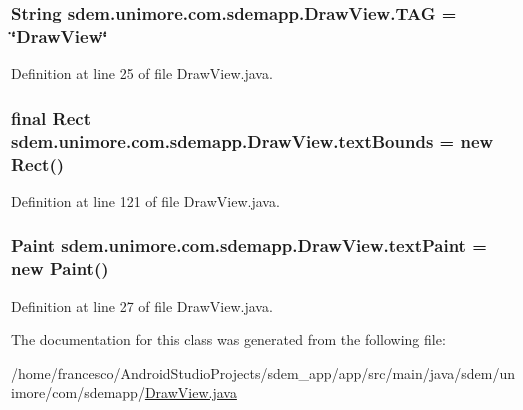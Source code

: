 \hypertarget{classsdem_1_1unimore_1_1com_1_1sdemapp_1_1_draw_view_af41e859612eca5912d91f30943c88ce9}{
\subsubsection[{T\+A\+G}]{\setlength{\rightskip}{0pt plus 5cm}String sdem.\+unimore.\+com.\+sdemapp.\+Draw\+View.\+T\+A\+G = \char`\"{}Draw\+View\char`\"{}\hspace{0.3cm}{\ttfamily [private]}}}\label{classsdem_1_1unimore_1_1com_1_1sdemapp_1_1_draw_view_af41e859612eca5912d91f30943c88ce9}


Definition at line 25 of file Draw\+View.\+java.

\hypertarget{classsdem_1_1unimore_1_1com_1_1sdemapp_1_1_draw_view_a811fad9a94cbc9ac990565ea2c267622}{
\subsubsection[{text\+Bounds}]{\setlength{\rightskip}{0pt plus 5cm}final Rect sdem.\+unimore.\+com.\+sdemapp.\+Draw\+View.\+text\+Bounds = new Rect()\hspace{0.3cm}{\ttfamily [private]}}}\label{classsdem_1_1unimore_1_1com_1_1sdemapp_1_1_draw_view_a811fad9a94cbc9ac990565ea2c267622}


Definition at line 121 of file Draw\+View.\+java.

\hypertarget{classsdem_1_1unimore_1_1com_1_1sdemapp_1_1_draw_view_a959c19f5531a98df05d0ff3ad8de02a2}{
\subsubsection[{text\+Paint}]{\setlength{\rightskip}{0pt plus 5cm}Paint sdem.\+unimore.\+com.\+sdemapp.\+Draw\+View.\+text\+Paint = new Paint()\hspace{0.3cm}{\ttfamily [private]}}}\label{classsdem_1_1unimore_1_1com_1_1sdemapp_1_1_draw_view_a959c19f5531a98df05d0ff3ad8de02a2}


Definition at line 27 of file Draw\+View.\+java.



The documentation for this class was generated from the following file\+:\begin{DoxyCompactItemize}
\item 
/home/francesco/\+Android\+Studio\+Projects/sdem\+\_\+app/app/src/main/java/sdem/unimore/com/sdemapp/\hyperlink{_draw_view_8java}{Draw\+View.\+java}\end{DoxyCompactItemize}
